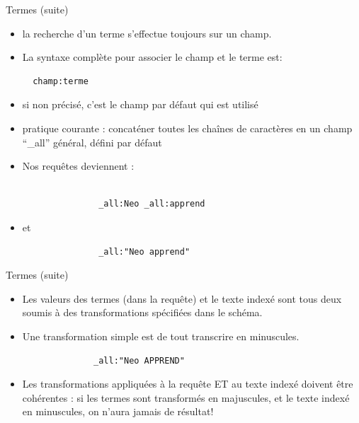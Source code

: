 \begin{frame}[fragile]{Termes (suite)}
  \begin{itemize}
    \item la recherche d'un terme s'effectue toujours sur un champ. 
\item La syntaxe complète pour associer le champ et le terme est:
\begin{verbatim}
  champ:terme
\end{verbatim}
\item si non précisé, c'est le champ par défaut qui est utilisé
\item pratique courante : concaténer toutes les chaînes de caractères en un
  champ ``\_all'' général, défini par défaut
\item Nos requêtes deviennent :
\begin{verbatim}

               _all:Neo _all:apprend
\end{verbatim}
\item et 
\begin{verbatim}
               _all:"Neo apprend"
\end{verbatim}
  \end{itemize}
\end{frame}

\begin{frame}[fragile]{Termes (suite)}

  \begin{itemize}
    \item Les valeurs des termes (dans la requête) et le texte indexé sont tous deux
soumis à des transformations spécifiées dans le schéma. 
\item Une transformation simple est de tout transcrire en minuscules. 
\begin{verbatim}
              _all:"Neo APPREND"
\end{verbatim}
\item  Les transformations appliquées à la requête ET au texte indexé doivent être 
   cohérentes : si les termes sont transformés en majuscules, et le texte indexé en minuscules,
   on n'aura jamais de résultat!
  \end{itemize}
\end{frame}

